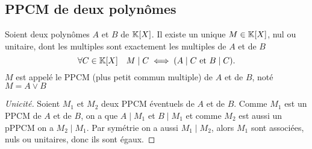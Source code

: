 \subsection{PPCM de deux polynômes}

\begin{prop}
  Soient deux polynômes \(A\) et \(B\) de \(\mathbb{K}[X]\). Il existe un unique \(M \in 
  \mathbb{K}[X]\), nul ou unitaire, dont les multiples sont exactement les multiples de 
  \(A\) et de \(B\)
  \begin{equation}
    \forall C \in \mathbb{K}[X] \quad M\mid{}C \iff (A\mid{}C \text{~et~} B\mid{}C).
  \end{equation}
  \(M\) est appelé le PPCM (plus petit commun multiple) de \(A\) et de \(B\), 
  noté \(M = A \vee B\)
\end{prop}
\begin{proof}[Unicité]
  Soient \(M_1\) et \(M_2\) deux PPCM éventuels de \(A\) et de \(B\). Comme 
  \(M_1\) est un PPCM de \(A\) et de \(B\), on a que \(A\mid{}M_1\) et 
  \(B\mid{}M_1\) et comme \(M_2\) est aussi un pPPCM on a \(M_2\mid{}M_1\). Par 
  symétrie on a aussi \(M_1\mid{}M_2\), alors \(M_1\) sont associées, nuls ou 
  unitaires, donc ils sont égaux.
\end{proof}
